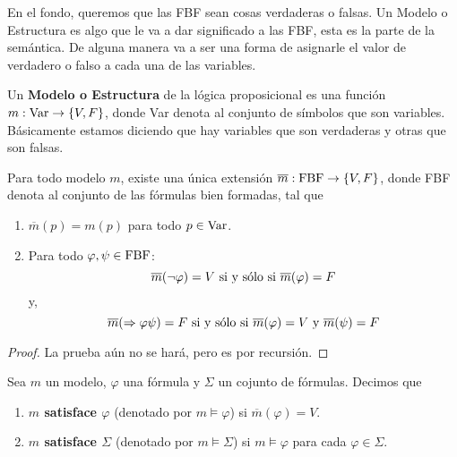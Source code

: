 \documentclass[12pt]{report}
\newcounter{it}
\theoremstyle{largebreak}
\newcommand\cf[3]{\ensuremath{#1:#2\rightarrow#3}}
\begin{document}
    En el fondo, queremos que las FBF sean cosas verdaderas o falsas. Un Modelo o Estructura es algo que le va a dar significado a las FBF, esta es la parte de la semántica. De alguna manera va a ser una forma de asignarle el valor de verdadero o falso a cada una de las variables.

    \begin{mydef}
        Un \textbf{Modelo o Estructura} de la lógica proposicional es una función $\cf{m}{\textup{Var}}{\left\{V,F\right\}}$, donde Var denota al conjunto de símbolos que son variables. Básicamente estamos diciendo que hay variables que son verdaderas y otras que son falsas.
    \end{mydef}

    \begin{theor}
        Para todo modelo $m$, existe una única extensión $\cf{\overline{m}}{\textup{FBF}}{\left\{V,F\right\}}$, donde FBF denota al conjunto de las fórmulas bien formadas, tal que
        \begin{enumerate}
            \item $\overline{m}(p)=m(p)$ para todo $p\in\textup{Var}$.
            \item Para todo $\varphi,\psi\in\textup{FBF}$:
            \begin{equation*}
                \overline{m}(\neg\varphi)=V\textup{ si y sólo si } \overline{m}(\varphi)=F
            \end{equation*}
            y,
            \begin{equation*}
                \overline{m}(\Rightarrow\varphi\psi)=F\textup{ si y sólo si }\overline{m}(\varphi)=V\textup{ y } \overline{m}(\psi)=F
            \end{equation*}
        \end{enumerate}
    \end{theor}

    \begin{proof}
        La prueba aún no se hará, pero es por recursión.
    \end{proof}

    \begin{mydef}
        Sea $m$ un modelo, $\varphi$ una fórmula y $\Sigma$ un cojunto de fórmulas. Decimos que
        \begin{enumerate}
            \item \textbf{$m$ satisface $\varphi$} (denotado por $m\vDash \varphi$) si $\overline{m}(\varphi)=V$.
            \item \textbf{$m$ satisface $\Sigma$} (denotado por $m\vDash \Sigma$) si $m\vDash\varphi$ para cada $\varphi\in\Sigma$.
        \end{enumerate}
    \end{mydef}
\end{document}
